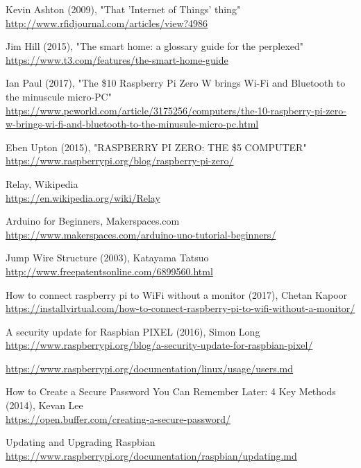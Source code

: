 \begin{thebibliography}{99}

Kevin Ashton (2009), "That 'Internet of Things' thing"\\
\url{http://www.rfidjournal.com/articles/view?4986}

Jim Hill (2015), "The smart home: a glossary guide for the perplexed"\\
\url{https://www.t3.com/features/the-smart-home-guide}

Ian Paul (2017), "The \$10 Raspberry Pi Zero W brings Wi-Fi and Bluetooth to the minuscule micro-PC"\\
\url{https://www.pcworld.com/article/3175256/computers/the-10-raspberry-pi-zero-w-brings-wi-fi-and-bluetooth-to-the-minusule-micro-pc.html}

Eben Upton (2015), "RASPBERRY PI ZERO: THE \$5 COMPUTER"\\
\url{https://www.raspberrypi.org/blog/raspberry-pi-zero/}

Relay, Wikipedia\\
\url{https://en.wikipedia.org/wiki/Relay}

Arduino for Beginners, Makerspaces.com\\
\url{https://www.makerspaces.com/arduino-uno-tutorial-beginners/}

Jump Wire Structure (2003), Katayama Tatsuo\\
\url{http://www.freepatentsonline.com/6899560.html}

How to connect raspberry pi to WiFi without a monitor (2017), Chetan Kapoor\\
\url{https://installvirtual.com/how-to-connect-raspberry-pi-to-wifi-without-a-monitor/}

A security update for Raspbian PIXEL (2016), Simon Long\\ 
\url{https://www.raspberrypi.org/blog/a-security-update-for-raspbian-pixel/}

\url{https://www.raspberrypi.org/documentation/linux/usage/users.md}

How to Create a Secure Password You Can Remember Later: 4 Key Methods (2014), Kevan Lee\\
\url{https://open.buffer.com/creating-a-secure-password/}

Updating and Upgrading Raspbian
\url{https://www.raspberrypi.org/documentation/raspbian/updating.md}

\end{thebibliography}